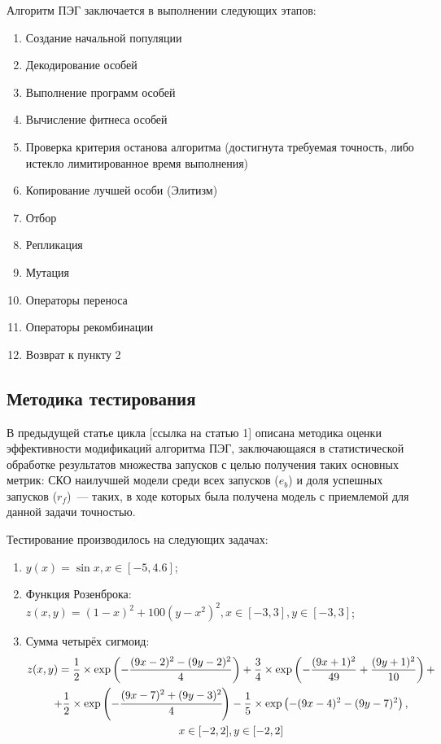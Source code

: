 Алгоритм ПЭГ заключается в выполнении следующих этапов:
\begin{enumerate} \itemsep0pt \parskip0pt 
  \item Создание начальной популяции
  \item Декодирование особей
  \item Выполнение программ особей
  \item Вычисление фитнеса особей
  \item Проверка критерия останова алгоритма (достигнута требуемая точность, либо истекло лимитированное время выполнения)
  \item Копирование лучшей особи (Элитизм)
  \item Отбор
  \item Репликация
  \item Мутация
  \item Операторы переноса
  \item Операторы рекомбинации
  \item Возврат к пункту 2
\end{enumerate}




\subsection{Методика тестирования}

В предыдущей статье цикла [ссылка на статью 1] описана методика оценки эффективности модификаций алгоритма ПЭГ, заключающаяся в статистической обработке результатов множества запусков с целью получения таких основных метрик: СКО наилучшей модели среди всех запусков ($e_{b}$) и доля успешных запусков ($r_{f}$)~--- таких, в ходе которых была получена модель с приемлемой для данной задачи точностью.

Тестирование производилось на следующих задачах:
\begin{enumerate}
  \item $y(x) = \sin x, x \in [-5, 4.6]$;
  \item Функция Розенброка: $z(x, y) = {(1 - x)}^2 + 100 {(y - x^2)}^2, x \in [-3, 3], y \in [-3, 3]$;
  \item Сумма четырёх сигмоид:
    \begin{multline}
      z(x, y) = \frac{1}{2} \times \exp\left(-\frac{(9x-2)^2 - (9y-2)^2}{4}\right) + \frac{3}{4} \times \exp\left(-\frac{(9x+1)^2}{49} + \frac{(9y+1)^2}{10}\right) + \\
      + \frac{1}{2} \times \exp\left(-\cfrac{(9x-7)^2 + (9y-3)^2}{4}\right) -\frac{1}{5} \times \exp\left(-(9x-4)^2 - (9y-7)^2\right), \\
      x \in [-2, 2], y \in [-2, 2]
    \end{multline}
\end{enumerate}



